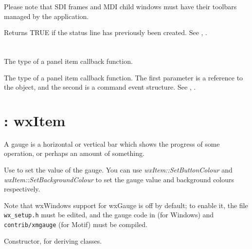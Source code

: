 Please note that SDI frames and MDI child windows must have their
toolbars managed by the application.

\label{wxframestatuslineexists}


Returns TRUE if the status line has previously been created.
See , .

\section{}\label{wxfunction}

The type of a panel item callback function.



The type of a panel item callback function. The first parameter is a reference
to the object, and the second is a command event structure.
See , .

\section{: wxItem}\label{wxgauge}

A gauge is a horizontal or vertical bar which shows the progress of
some operation, or perhaps an amount of something.

Use  to set the value of
the gauge. You can use {\it wxItem::SetButtonColour} and {\it wxItem::SetBackgroundColour} to
set the gauge value and background colours respectively.

Note that wxWindows support for wxGauge is off by default; to enable it,
the file {\tt wx\_setup.h} must be edited, and the gauge code in
 (for Windows) and {\tt contrib/xmgauge} (for Motif)
must be compiled.

\label{gauge}


Constructor, for deriving classes.


